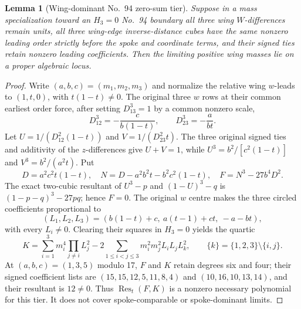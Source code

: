 \documentclass[11pt]{amsart}
\newtheorem{lemma}[theorem]{Lemma}
\theoremstyle{remark}
\begin{document}
\begin{lemma}[Wing-dominant No.~94 zero-sum tier]\label{lem:no94-wing-dominant}
Suppose in a mass specialization toward an $H_3=0$ No.~94 boundary all three wing $W$-differences remain units, all three wing-edge inverse-distance cubes have the same nonzero leading order strictly before the spoke and coordinate terms, and their signed ties retain nonzero leading coefficients. Then the limiting positive wing masses lie on a proper algebraic locus.
\end{lemma}
\begin{proof}
Write $(a,b,c)=(m_1,m_2,m_3)$ and normalize the relative wing $w$-leads to $(1,t,0)$, with $t(1-t)\ne0$. The original three $w$ rows at their common earliest order force, after setting $D_{13}^3=1$ by a common nonzero scale,
\[
D_{12}^3=-\frac{c}{b(1-t)},\qquad D_{23}^3=-\frac{a}{bt}.
\]
Let $U=1/(D_{12}^2(1-t))$ and $V=1/(D_{23}^2t)$. The three original signed ties and additivity of the $z$-differences give $U+V=1$, while $U^3=b^2/[c^2(1-t)]$ and $V^3=b^2/(a^2t)$. Put
\[
D=a^2c^2t(1-t),\quad N=D-a^2b^2t-b^2c^2(1-t),\quad F=N^3-27b^4D^2.
\]
The exact two-cubic resultant of $U^3-p$ and $(1-U)^3-q$ is $(1-p-q)^3-27pq$; hence $F=0$. The original $w$ centre makes the three circled coefficients proportional to
\[
(L_1,L_2,L_3)=(b(1-t)+c,\ a(t-1)+ct,\ -a-bt),
\]
with every $L_i\ne0$. Clearing their squares in $H_3=0$ yields the quartic
\[
K=\sum_{i=1}^3m_i^4\prod_{j\ne i}L_j^2
-2\sum_{1\le i<j\le3}m_i^2m_j^2L_iL_jL_k^2,
\qquad\{k\}=\{1,2,3\}\setminus\{i,j\}.
\]
At $(a,b,c)=(1,3,5)$ modulo 17, $F$ and $K$ retain degrees six and four; their signed coefficient lists are $(15,15,12,5,11,8,4)$ and $(10,16,10,13,14)$, and their resultant is $12\ne0$. Thus $\operatorname{Res}_t(F,K)$ is a nonzero necessary polynomial for this tier. It does not cover spoke-comparable or spoke-dominant limits.
\end{proof}
\end{document}
